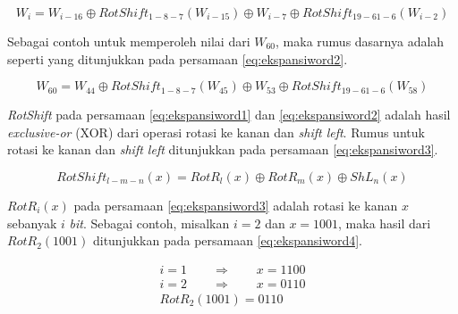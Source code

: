 \begin{equation}
	W_i = W_{i-16} \oplus RotShift_{1-8-7}(W_{i-15}) \oplus W_{i-7} \oplus RotShift_{19-61-6}(W_{i-2}) \label{eq:ekspansiword1}
\end{equation}

Sebagai contoh untuk memperoleh nilai dari \begin{math}W_{60}\end{math}, maka rumus dasarnya adalah seperti yang ditunjukkan pada persamaan \ref{eq:ekspansiword2}.

\begin{equation}
	W_{60} = W_{44} \oplus RotShift_{1-8-7}(W_{45}) \oplus W_{53} \oplus RotShift_{19-61-6}(W_{58}) \label{eq:ekspansiword2}
\end{equation}

\textit{RotShift} pada persamaan \ref{eq:ekspansiword1} dan \ref{eq:ekspansiword2} adalah hasil \textit{exclusive-or} (XOR) dari operasi rotasi ke kanan dan \textit{shift left}. Rumus untuk rotasi ke kanan dan \textit{shift left} ditunjukkan pada persamaan \ref{eq:ekspansiword3}.

\begin{equation}
	RotShift_{l-m-n}(x) = RotR_l(x) \oplus RotR_m(x) \oplus ShL_n(x) \label{eq:ekspansiword3}
\end{equation}

\begin{math}RotR_i(x)\end{math} pada persamaan \ref{eq:ekspansiword3} adalah rotasi ke kanan \begin{math}x\end{math} sebanyak \begin{math}i\end{math} \textit{bit}. Sebagai contoh, misalkan \begin{math}i=2\end{math} dan \begin{math}x=1001\end{math}, maka hasil dari \begin{math}RotR_2(1001)\end{math} ditunjukkan pada persamaan \ref{eq:ekspansiword4}.

\begin{align}
	i = 1 \qquad\Rightarrow\qquad x = 1100 \nonumber \\
	i = 2 \qquad\Rightarrow\qquad x = 0110 \label{eq:ekspansiword4} \\
	RotR_2(1001) = 0110 \nonumber
\end{align}

